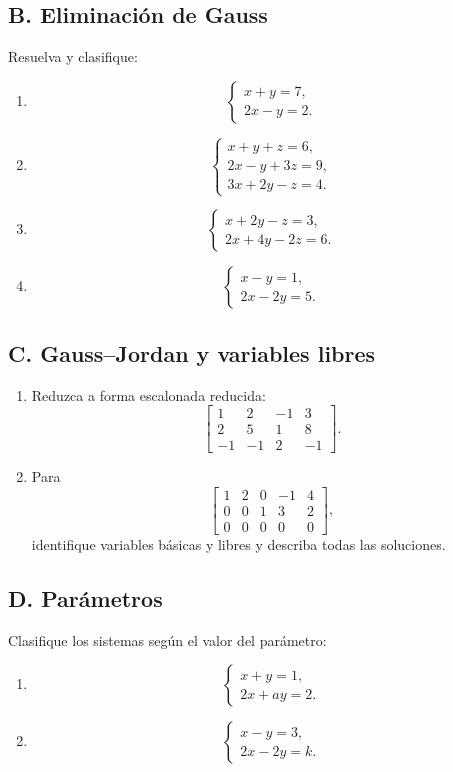 \documentclass[12pt]{article}
\theoremstyle{remark}
\begin{document}
\subsection*{B. Eliminación de Gauss}
Resuelva y clasifique:
\begin{enumerate}
\item
\[
\begin{cases}
x+y=7,\\
2x-y=2.
\end{cases}
\]
\item
\[
\begin{cases}
x+y+z=6,\\
2x-y+3z=9,\\
3x+2y-z=4.
\end{cases}
\]
\item
\[
\begin{cases}
x+2y-z=3,\\
2x+4y-2z=6.
\end{cases}
\]
\item
\[
\begin{cases}
x-y=1,\\
2x-2y=5.
\end{cases}
\]
\end{enumerate}

\subsection*{C. Gauss--Jordan y variables libres}
\begin{enumerate}
\item Reduzca a forma escalonada reducida:
\[
\left[
\begin{array}{ccc|c}
1&2&-1&3\\
2&5&1&8\\
-1&-1&2&-1
\end{array}
\right].
\]
\item Para
\[
\left[
\begin{array}{cccc|c}
1&2&0&-1&4\\
0&0&1&3&2\\
0&0&0&0&0
\end{array}
\right],
\]
identifique variables básicas y libres y describa todas las soluciones.
\end{enumerate}

\subsection*{D. Parámetros}
Clasifique los sistemas según el valor del parámetro:
\begin{enumerate}
\item
\[
\begin{cases}
x+y=1,\\
2x+ay=2.
\end{cases}
\]
\item
\[
\begin{cases}
x-y=3,\\
2x-2y=k.
\end{cases}
\]
\end{enumerate}
\end{document}

